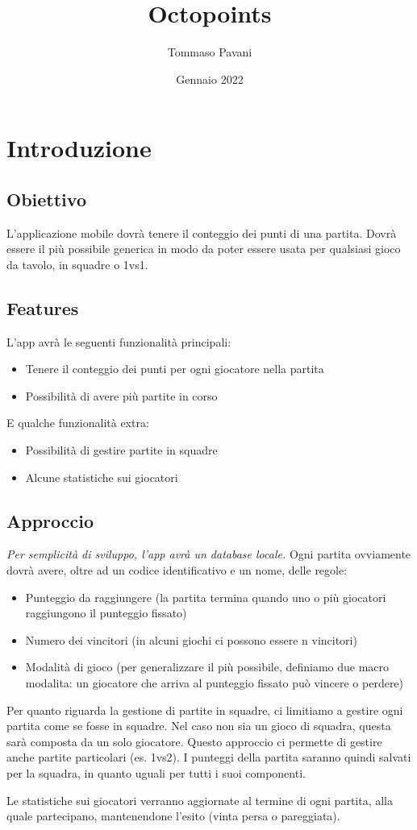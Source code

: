\documentclass[12pt, letterpaper]{article}
\title{Octopoints}
\author{Tommaso Pavani}
\date{Gennaio 2022}
\begin{document}
    \maketitle
    \section{Introduzione}
    \subsection{Obiettivo}
    L'applicazione mobile dovrà tenere il conteggio dei punti di una partita.
    Dovrà essere il più possibile generica in modo da poter essere usata per qualsiasi gioco da tavolo, in squadre o 1vs1.
    \subsection{Features}
    L'app avrà le seguenti funzionalità principali:
    \begin{itemize}
        \item Tenere il conteggio dei punti per ogni giocatore nella partita
        \item Possibilità di avere più partite in corso
    \end{itemize}
    E qualche funzionalità extra:
    \begin{itemize}
        \item Possibilità di gestire partite in squadre
        \item Alcune statistiche sui giocatori
    \end{itemize}
    \subsection{Approccio}
    \emph{Per semplicità di sviluppo, l'app avrà un database locale.}
    \newline
    Ogni partita ovviamente dovrà avere, oltre ad un codice identificativo e un nome, delle regole:
    \begin{itemize}
        \item Punteggio da raggiungere (la partita termina quando uno o più giocatori raggiungono il punteggio fissato)
        \item Numero dei vincitori (in alcuni giochi ci possono essere n vincitori)
        \item Modalità di gioco (per generalizzare il più possibile, definiamo due macro modalita: un giocatore che arriva al punteggio fissato può vincere o perdere)
    \end{itemize}
    Per quanto riguarda la gestione di partite in squadre, ci limitiamo a gestire ogni partita come se fosse in squadre. Nel caso non sia un gioco di squadra, questa sarà composta da un solo giocatore.
    Questo approccio ci permette di gestire anche partite particolari (es. 1vs2).
    I punteggi della partita saranno quindi salvati per la squadra, in quanto uguali per tutti i suoi componenti.
    
    Le statistiche sui giocatori verranno aggiornate al termine di ogni partita, alla quale partecipano, mantenendone l'esito (vinta persa o pareggiata).
\end{document}
